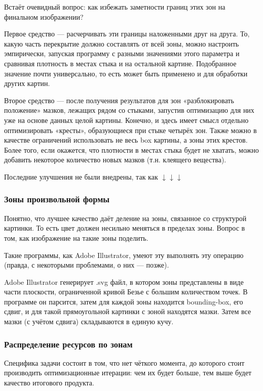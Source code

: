 Встаёт очевидный вопрос: как избежать заметности границ этих зон на финальном изображении?

Первое средство — расчерчивать эти границы наложенными друг на друга.
То, какую часть перекрытие должно составлять от всей зоны, можно настроить эмпирически, запуская программу с разными значениями этого параметра
и сравнивая плотность в местах стыка и на остальной картине.
Подобранное значение почти универсально, то есть может быть применено и для обработки других картин.

Второе средство — после получения результатов для зон «разблокировать положение» мазков, лежащих рядом со стыками,
запустив оптимизацию для них уже на основе данных целой картины.
Конечно, и здесь имеет смысл отдельно оптимизировать «кресты», образующиеся при стыке четырёх зон.
Также можно в качестве ограничений использовать не весь box картины, а зоны этих крестов.
Более того, если окажется, что плотности в местах стыка будет не хватать, можно добавить некоторое количество новых мазков (т.н. клеящего вещества).

Последние улучшения не были внедрены, так как $\downarrow\downarrow\downarrow$ %

\subsubsection{Зоны произвольной формы}
Понятно, что лучшее качество даёт деление на зоны, связанное со структурой картинки.
То есть цвет должен несильно меняться в пределах зоны.
Вопрос в том, как изображение на такие зоны поделить.

Такие программы, как Adobe Illustrator, умеют эту выполнять эту операцию (правда, с некоторыми проблемами, о них — позже).

Adobe Illustrator генерирует .svg файл, в котором зоны представлены в виде части плоскости,
ограниченной кривой Безье с большим количеством точек.
В программе он парсится, затем для каждой зоны находится bounding-box, его сдвиг,
и для такой прямоугольной картинки с зоной находятся мазки.
Затем все мазки (с учётом сдвига) складываются в единую кучу.


\subsubsection{Распределение ресурсов по зонам}
Специфика задачи состоит в том, что нет чёткого момента, до которого стоит производить оптимизационные итерации:
чем их будет больше, тем выше будет качество итогового продукта.

